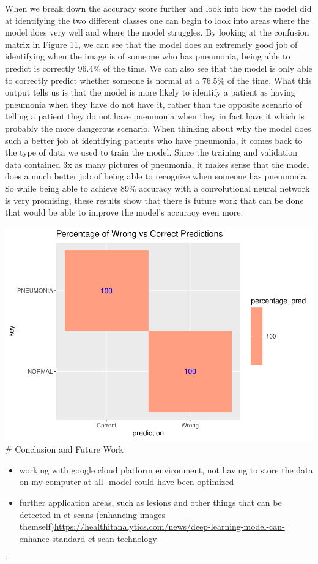 \documentclass[12pt]{article}
\providecommand{\tightlist}{%
  \setlength{\itemsep}{0pt}\setlength{\parskip}{0pt}}
\begin{document}
When we break down the accuracy score further and look into how the
model did at identifying the two different classes one can begin to look
into areas where the model does very well and where the model struggles.
By looking at the confusion matrix in Figure 11, we can see that the
model does an extremely good job of identifying when the image is of
someone who has pneumonia, being able to predict is correctly 96.4\% of
the time. We can also see that the model is only able to correctly
predict whether someone is normal at a 76.5\% of the time. What this
output tells us is that the model is more likely to identify a patient
as having pneumonia when they have do not have it, rather than the
opposite scenario of telling a patient they do not have pneumonia when
they in fact have it which is probably the more dangerous scenario. When
thinking about why the model does such a better job at identifying
patients who have pneumonia, it comes back to the type of data we used
to train the model. Since the training and validation data contained 3x
as many pictures of pneumonia, it makes sense that the model does a much
better job of being able to recognize when someone has pneumonia. So
while being able to achieve 89\% accuracy with a convolutional neural
network is very promising, these results show that there is future work
that can be done that would be able to improve the model's accuracy even
more.

\includegraphics{report_files/figure-latex/unnamed-chunk-11-1.pdf} \#
Conclusion and Future Work

\begin{itemize}
\tightlist
\item
  working with google cloud platform environment, not having to store
  the data on my computer at all -model could have been optimized
\item
  further application areas, such as lesions and other things that can
  be detected in ct scans (enhancing images
  themself)\url{https://healthitanalytics.com/news/deep-learning-model-can-enhance-standard-ct-scan-technology}
\end{itemize}

`



\end{document}
